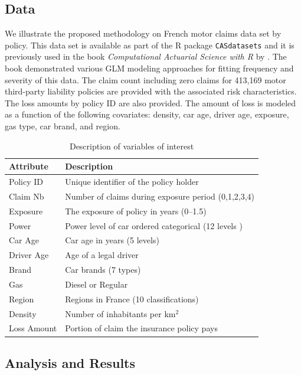 \documentclass[11pt,letterpaper]{article}
\numberwithin{equation}{section}
\numberwithin{equation}{section}
\numberwithin{equation}{section}
\begin{document}
\subsection{Data}
We illustrate the proposed methodology on French motor claims data set by policy. This data set is available as part of the R package {\tt CASdatasets} and it is previously used in the book {\it Computational Actuarial Science with R}  by \cite{Charpentier:2014}.
The book demonstrated various GLM modeling approaches for fitting frequency and severity of this data. The claim count including zero claims for 413,169 motor third-party liability policies are provided with the associated risk characteristics. The loss amounts by policy ID are also provided. The amount of loss is modeled as a function of the following covariates: density, car age, driver age, exposure, gas type, car brand, and region.
\begin{small}
\begin{table}[!htb]
\begin{center}
    \caption{Description of variables of interest}%
      \centering
        \begin{tabular}{ll}
\hline
Attribute & Description \\
\hline
Policy ID & Unique identifier of the policy holder\\
Claim Nb & Number of claims during exposure period  (0,1,2,3,4)\\
Exposure & The exposure of policy in years (0--1.5) \\
Power & Power level of car ordered categorical (12 levels )\\
Car Age & Car age in years (5 levels) \\
Driver Age & Age of a legal driver \\
Brand & Car brands (7 types) \\
Gas & Diesel or Regular \\
Region & Regions in France (10 classifications)\\
Density & Number of inhabitants per km$^2$ \\
Loss Amount & Portion of claim the insurance policy pays\\
\hline
		\end{tabular}
\end{center}
\end{table}
\end{small}

\subsection{Analysis and Results}
\end{document}
